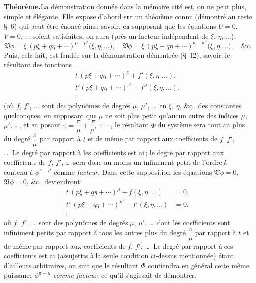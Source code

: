 \documentclass[11pt,a4paper]{article}
\begin{document}
\medskip

\noindent\textbf{Th\'eor\`eme.}\quad La d\'emonstration donn\'ee dans la m\'emoire cit\'e est, on ne peut plus, simple et \'el\'egante. Elle expose d'abord sur un th\'eor\`eme connu (d\'emontr\'e au reste \S\ 6) qui peut \^etre \'enonc\'e ainsi; savoir, en supposant que les \'equations $U = 0$, $V = 0$, $\ldots$ soient satisfaites, on aura (pr\`es un facteur ind\'ependant de $\xi$, $\eta$, $\ldots$),
\[
\mathfrak{V}\phi = \xi\,(p\xi + q\eta + \cdots)^{\mu - \mu'}\bigl(\xi, \eta, \ldots\bigr),\quad
\mathfrak{V}\phi = \xi\,(p\xi + q\eta + \cdots)^{\mu - \mu''}\bigl(\xi, \eta, \ldots\bigr),\quad\&\mathrm{c}.
\]
Puis, cela fait, est fond\'ee sur la d\'emonstration d\'emontr\'ee (\S\ 12), savoir: le r\'esultant des fonctions
\begin{align*}
t\,(p\xi + q\eta + \cdots)^{\mu} + f'(\xi, \eta, \ldots),\\
t'(p\xi + q\eta + \cdots)^{\mu'} + f''(\xi, \eta, \ldots),\\
\vdots
\end{align*}
(o\`u $f$, $f'$, $\ldots$ sont des polyn\^omes de degr\'es $\mu$, $\mu'$, \ldots\ en $\xi$, $\eta$, \&c., des constantes quelconques, en supposant que $\mu$ ne soit plus petit qu'aucun autre des indices $\mu$, $\mu'$, \ldots, et en posant $\pi = \dfrac{\pi}{\mu} + \dfrac{\pi}{\mu'} + \cdots$, le r\'esultant $\Phi$ du syst\`eme sera tout au plus du degr\'e $\dfrac{\pi}{\mu}$ par rapport \`a $t$ et de m\^eme par rapport aux coefficients de $f$, $f'$, \ldots\ Le degr\'e par rapport \`a les coefficients est ai\,; le degr\'e par rapport aux coefficients de $f$, $f'$, \ldots\ sera donc au moins un infiniment petit de l'ordre $k$ contenu \`a $\phi^{\pi - \mu}$ comme \emph{facteur}. Dans cette supposition les \'equations $\mathfrak{V}\phi = 0$, $\mathfrak{V}\phi = 0$, \&c.\ deviendront:
\begin{align*}
t\,(p\xi + q\eta + \cdots)^{\mu} + f(\xi, \eta, \ldots) &= 0,\\
t'\,(p\xi + q\eta + \cdots)^{\mu'} + f'(\xi, \eta, \ldots) &= 0,\\
\vdots
\end{align*}
o\`u $f$, $f'$, \ldots\ sont des polyn\^omes de degr\'es $\mu$, $\mu'$, \ldots\ dont les coefficients sont infiniment petits par rapport \`a tous les autres plus du degr\'e $\dfrac{\pi}{\mu}$ par rapport \`a $t$ et de m\^eme par rapport aux coefficients de $f$, $f'$, \ldots\ Le degr\'e par rapport \`a ces coefficients est ai (assujettis \`a la seule condition ci-dessus mentionn\'ee) \'etant d'ailleurs arbitraires, on suit que le r\'esultant $\Phi$ contiendra en g\'en\'eral cette m\^eme puissance $\phi^{\pi - \mu}$ \emph{comme facteur}; ce qu'il s'agissait de d\'emontrer.
\end{document}
